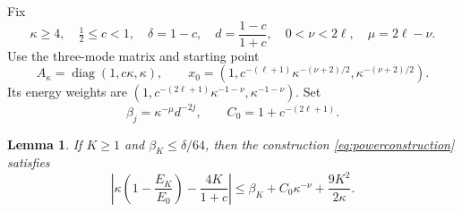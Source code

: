\documentclass[11pt,a4paper]{article}
\newtheorem{lemma}[theorem]{Lemma}
\theoremstyle{remark}
\newcommand{\diag}{\operatorname{diag}}
\begin{document}
Fix
\begin{equation}\label{eq:parameters}
 \kappa\ge4,\quad \tfrac12\le c<1,\quad
 \delta=1-c,\quad d=\frac{1-c}{1+c},\quad
 0<\nu<2\ell,\quad\mu=2\ell-\nu.
\end{equation}
Use the three-mode matrix and starting point
\begin{equation}\label{eq:powerconstruction}
 A_\kappa=\diag(1,c\kappa,\kappa),\qquad
 x_0=\left(1,c^{-(\ell+1)}\kappa^{-(\nu+2)/2},
 \kappa^{-(\nu+2)/2}\right).
\end{equation}
Its energy weights are $(1,c^{-(2\ell+1)}\kappa^{-1-\nu},\kappa^{-1-\nu})$. Set
\[
 \beta_j=\kappa^{-\mu}d^{-2j},\qquad C_0=1+c^{-(2\ell+1)}.
\]

\begin{lemma}\label{lem:uniform}
If $K\ge1$ and $\beta_K\le\delta/64$, then the construction \eqref{eq:powerconstruction} satisfies
\begin{equation}\label{eq:quantitative}
 \left|\kappa\left(1-\frac{E_K}{E_0}\right)-\frac{4K}{1+c}\right|
 \le\beta_K+C_0\kappa^{-\nu}+\frac{9K^2}{2\kappa}.
\end{equation}
\end{lemma}
\end{document}
